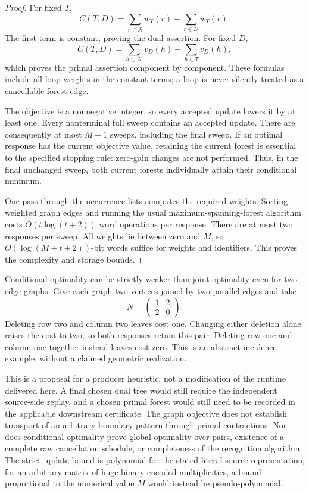 \begin{proof}
For fixed $T$,
\[
 C(T,D)=\sum_{r\in\mathcal R}w_T(r)-\sum_{r\in D}w_T(r).
\]
The first term is constant, proving the dual assertion. For fixed $D$,
\[
 C(T,D)=\sum_{h\in\mathcal H}v_D(h)-\sum_{h\in T}v_D(h),
\]
which proves the primal assertion component by component. These formulas
include all loop weights in the constant terms; a loop is never silently
treated as a cancellable forest edge.

The objective is a nonnegative integer, so every accepted update lowers it
by at least one. Every nonterminal full sweep contains an accepted update.
There are consequently at most $M+1$ sweeps, including the final sweep.
If an optimal response has the current objective value, retaining the
current forest is essential to the specified stopping rule: zero-gain
changes are not performed. Thus, in the final unchanged sweep, both
current forests individually attain their conditional minimum.

One pass through the occurrence lists computes the required weights.
Sorting weighted graph edges and running the usual maximum-spanning-forest
algorithm costs $O(t\log(t+2))$ word operations per response. There are at
most two responses per sweep. All weights lie between zero and $M$, so
$O(\log(M+t+2))$-bit words suffice for weights and identifiers. This proves
the complexity and storage bounds.
\end{proof}

Conditional optimality can be strictly weaker than joint optimality even
for two-edge graphs. Give each graph two vertices joined by two parallel
edges and take
\[
 N=\begin{pmatrix}1&2\\2&0\end{pmatrix}.
\]
Deleting row two and column two leaves cost one. Changing either deletion
alone raises the cost to two, so both responses retain this pair. Deleting
row one and column one together instead leaves cost zero. This is an
abstract incidence example, without a claimed geometric realization.

This is a proposal for a producer heuristic, not a modification of the
runtime delivered here. A final chosen dual tree would still require the
independent source-side replay, and a chosen primal forest would still
need to be recorded in the applicable downstream certificate. The graph
objective does not establish transport of an arbitrary boundary pattern
through primal contractions. Nor does conditional optimality prove global
optimality over pairs, existence of a complete raw cancellation schedule,
or completeness of the recognition algorithm. The strict-update bound is
polynomial for the stated literal source representation; for an arbitrary
matrix of huge binary-encoded multiplicities, a bound proportional to the
numerical value $M$ would instead be pseudo-polynomial.
